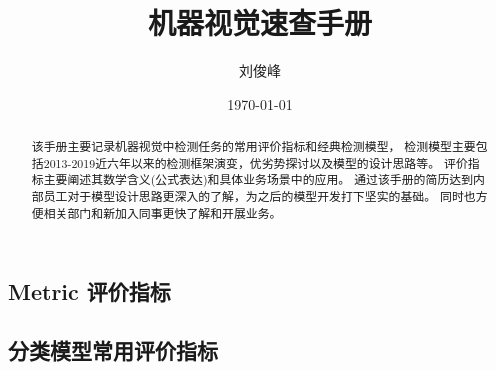 \documentclass{article}
\begin{document}
\begin{CJK}{UTF8}{gbsn}

\title{机器视觉速查手册}
\date{\today}
\author{刘俊峰}
\maketitle

\begin{abstract}
    该手册主要记录机器视觉中检测任务的常用评价指标和经典检测模型，
    检测模型主要包括2013-2019近六年以来的检测框架演变，优劣势探讨以及模型的设计思路等。
    评价指标主要阐述其数学含义(公式表达)和具体业务场景中的应用。
    通过该手册的简历达到内部员工对于模型设计思路更深入的了解，为之后的模型开发打下坚实的基础。
    同时也方便相关部门和新加入同事更快了解和开展业务。
\end{abstract}
\section{Metric 评价指标}
\subsection{分类模型常用评价指标}


\end{CJK}
\end{document}
